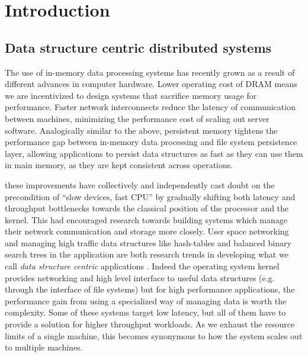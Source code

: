 \chapter{Introduction}
\label{chap:introduction}

\section{Data structure centric distributed systems}

The use of in-memory data processing systems has recently grown as a result of
different advances in computer hardware. Lower operating cost of DRAM means we
are incentivized to design systems that sacrifice memory usage for performance.
Faster network interconnects reduce the latency of communication between
machines, minimizing the performance cost of scaling out server software.
Analogically similar to the above, persistent memory tightens the performance
gap between in-memory data processing and file system persistence layer,
allowing applications to persist data structures as fast as they can use them
in main memory, as they are kept consistent across operations.

these improvements have collectively and independently cast doubt on the precondition of
``slow devices, fast CPU'' by gradually shifting both latency and throughput
bottlenecks towards the classical position of the processor and the kernel.
This had encouraged research towards building systems which manage their
network communication and storage more closely. User space networking  and managing high
traffic data structures like hash-tables and balanced binary search trees
 in the application are
both research trends in developing what we call \emph{data structure centric}
applications . Indeed the operating system kernel provides networking and high
level interface to useful data structures (e.g. through the interface of file
systems) but for high performance applications, the performance gain from using
a specialized way of managing data is worth the complexity.
Some of these systems target low latency, but all of them have to provide
a solution for higher throughput workloads. As we exhaust the resource limits
of a single machine, this becomes synonymous to how the system scales out to
multiple machines.

